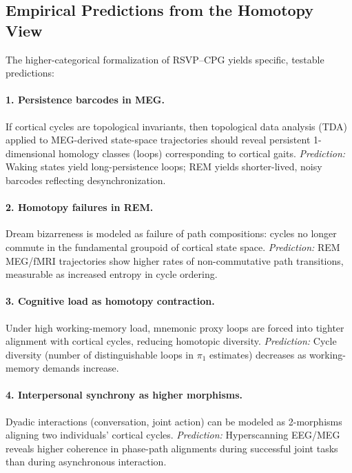 \documentclass{article}
\begin{document}
\subsection{Empirical Predictions from the Homotopy View}

The higher-categorical formalization of RSVP--CPG yields specific, testable predictions:

\paragraph{1. Persistence barcodes in MEG.}  
If cortical cycles are topological invariants, then topological data analysis (TDA) applied to MEG-derived state-space trajectories should reveal persistent 1-dimensional homology classes (loops) corresponding to cortical gaits.  
\emph{Prediction:} Waking states yield long-persistence loops; REM yields shorter-lived, noisy barcodes reflecting desynchronization.

\paragraph{2. Homotopy failures in REM.}  
Dream bizarreness is modeled as failure of path compositions: cycles no longer commute in the fundamental groupoid of cortical state space.  
\emph{Prediction:} REM MEG/fMRI trajectories show higher rates of non-commutative path transitions, measurable as increased entropy in cycle ordering.

\paragraph{3. Cognitive load as homotopy contraction.}  
Under high working-memory load, mnemonic proxy loops are forced into tighter alignment with cortical cycles, reducing homotopic diversity.  
\emph{Prediction:} Cycle diversity (number of distinguishable loops in $\pi_1$ estimates) decreases as working-memory demands increase.

\paragraph{4. Interpersonal synchrony as higher morphisms.}  
Dyadic interactions (conversation, joint action) can be modeled as 2-morphisms aligning two individuals’ cortical cycles.  
\emph{Prediction:} Hyperscanning EEG/MEG reveals higher coherence in phase-path alignments during successful joint tasks than during asynchronous interaction.
\end{document}
